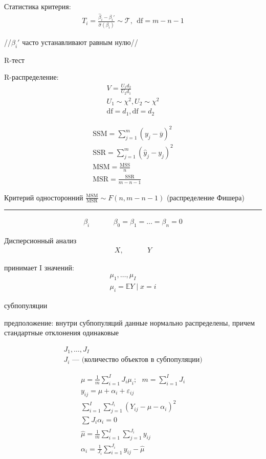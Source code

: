 \documentclass{book}
\begin{document}
Статистика критерия:
\begin{gather*}
    T_i =\frac{\hat{\beta}_i-\beta_i'}{\hat{\sigma}(\beta_i)} \sim \mathcal{T},~~ \mathrm{df}=m-n-1
\end{gather*}

//$\beta_i'$ часто устанавливают равным нулю//

R-тест

R-распределение:
\begin{gather*}
  V=\frac{U_1d_2}{U_2d_1}\\
  U_1 \sim \chi^2, U_2 \sim \chi^2\\
  \mathrm{df}=d_1, \mathrm{df}=d_2
\end{gather*}

\begin{gather*}
  \mathrm{SSM}=\sum_{j=1}^{m} {(y_j-\overline{y})}^2\\
  \mathrm{SSR}=\sum_{j=1}^{m} {(\hat{y}_j-y_j)^2}\\
  \mathrm{MSM}=\frac{\mathrm{MSS}}{n}\\
  \mathrm{MSR}=\frac{\mathrm{SSR}}{m-n-1}
\end{gather*}

Критерий односторонний $\frac{\mathrm{MSM}}{\mathrm{MSR}}\sim F(n, m-n-1)$
(распределение Фишера)


\hrule

\begin{gather*}
  \beta_i~~~~~~~~~~~~~~~\beta_0=\beta_1=\dots=\beta_n=0
\end{gather*}

Дисперсионный анализ
\begin{gather*}
  X,~~~~~~~~~~~~~~~Y
\end{gather*}

принимает I значений:
\begin{gather*}
  \mu_1,\dots,\mu_I\\
  \mu_i=\mathbb{E}Y\mid x=i
\end{gather*}

субпопуляции

предположение: внутри субпопуляций данные нормально распределены, причем стандартные отклонения одинаковые

\begin{gather*}
  J_1,\dots,J_I\\
  J_i\textrm{ --- (количество объектов в субпопуляции)}
\end{gather*}

\begin{gather*}
  \mu = \frac{1}{m}\sum_{i=1}^{I} {J_i\mu_i;~~~m=\sum_{i=1}^{I} {J_i}}\\
  y_{ij}=\mu+\alpha_i+\varepsilon_{ij}\\
  \sum_{i=1}^{I} \sum_{j=1}^{J_i} {(Y_{ij}-\mu-\alpha_i)^2}\\
  \sum_{}^{} {J_i\alpha_i}=0\\
  \hat{\mu}=\frac{1}{m}\sum_{i=1}^{I} {\sum_{j=1}^{J_i} {y_{ij}}}\\
  \alpha_i=\frac{1}{J_i}\sum_{i=1}^{J_i} {y_{ij}-\hat{\mu}}
\end{gather*}
\end{document}
